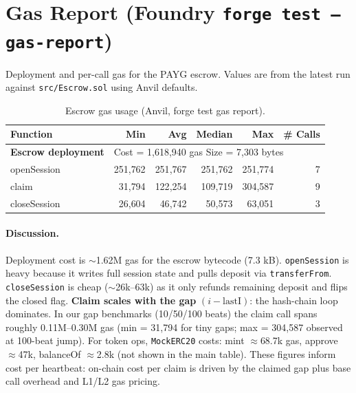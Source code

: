 \documentclass{article}
\begin{document}
\section*{Gas Report (Foundry \texttt{forge test --gas-report})}
Deployment and per-call gas for the PAYG escrow. Values are from the latest run against \texttt{src/Escrow.sol} using Anvil defaults.

\begin{table}[h!]
  \centering
  \begin{tabular}{lrrrrr}
    \toprule
    Function & Min & Avg & Median & Max & \# Calls \\
    \midrule
    \textbf{Escrow deployment} & \multicolumn{5}{l}{Cost = 1{,}618{,}940 gas \quad Size = 7{,}303 bytes} \\
    openSession & 251{,}762 & 251{,}767 & 251{,}762 & 251{,}774 & 7 \\
    claim       & 31{,}794 & 122{,}254 & 109{,}719 & 304{,}587 & 9 \\
    closeSession& 26{,}604 & 46{,}742 & 50{,}573 & 63{,}051 & 3 \\
    \bottomrule
  \end{tabular}
  \caption{Escrow gas usage (Anvil, forge test gas report).}
\end{table}

\paragraph{Discussion.} Deployment cost is $\sim$1.62M gas for the escrow bytecode (7.3 kB). \texttt{openSession} is heavy because it writes full session state and pulls deposit via \texttt{transferFrom}. \texttt{closeSession} is cheap ($\sim$26k--63k) as it only refunds remaining deposit and flips the closed flag. \textbf{Claim scales with the gap} $(i - \text{lastI})$: the hash-chain loop dominates. In our gap benchmarks (10/50/100 beats) the claim call spans roughly 0.11M--0.30M gas (min = 31{,}794 for tiny gaps; max = 304{,}587 observed at 100-beat jump). For token ops, \texttt{MockERC20} costs: mint $\approx$68.7k gas, approve $\approx$47k, balanceOf $\approx$2.8k (not shown in the main table). These figures inform cost per heartbeat: on-chain cost per claim is driven by the claimed gap plus base call overhead and L1/L2 gas pricing.
\end{document}
